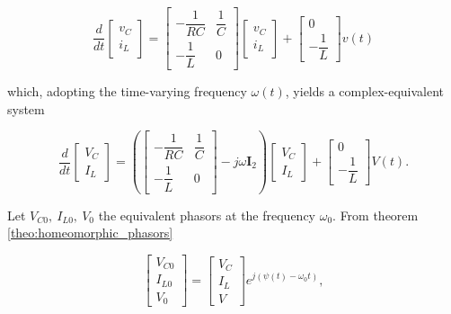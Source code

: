 \begin{example}
\begin{equation} \dfrac{d}{dt} \left[ \begin{array}{l} v_C \\[3mm] i_L \end{array}\right] = \left[\begin{array}{cc} -\dfrac{1}{RC} & \dfrac{1}{C} \\[5mm] - \dfrac{1}{L} & 0 \end{array}\right] \left[\begin{array}{c} v_C \\[5mm] i_L \end{array}\right] + \left[\begin{array}{c} 0 \\[3mm] -\dfrac{1}{L}\end{array}\right] v(t)\end{equation}

	\noindent which, adopting the time-varying frequency $\omega(t)$, yields a complex-equivalent system

\begin{equation} \dfrac{d}{dt} \left[ \begin{array}{l} V_C \\[3mm] I_L \end{array}\right] = \left(\left[\begin{array}{cc} -\dfrac{1}{RC} & \dfrac{1}{C} \\[5mm] - \dfrac{1}{L} & 0 \end{array}\right] - j\omega \mathbf{I}_2\right) \left[\begin{array}{c} V_C \\[5mm] I_L \end{array}\right] + \left[\begin{array}{c} 0 \\[3mm] -\dfrac{1}{L}\end{array}\right] V(t) . \label{eq:matrix_model_varying}\end{equation}

	Let $V_{C0},\ I_{L0},\ V_0$ the equivalent phasors at the frequency $\omega_0$. From theorem \ref{theo:homeomorphic_phasors}

\begin{equation} \left[ \begin{array}{l} V_{C0} \\[3mm] I_{L0} \\[3mm] V_0\end{array}\right] = \left[\begin{array}{l} V_C \\[3mm] I_L \\[3mm] V\end{array}\right] e^{j\left(\psi(t) - \omega_0 t\right)} ,\end{equation}


\end{example}
